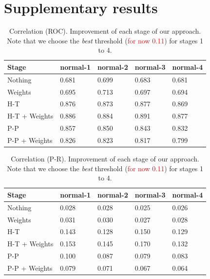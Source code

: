 \documentclass[wcp]{jmlr}
\begin{document}
\section{Supplementary results}

\begin{table}[htbp]
\centering
\caption{Correlation (ROC). Improvement of each stage of our approach. Note that we choose the
         \textit{best} threshold (\textcolor{red}{for now 0.11}) for stages 1 to 4.}
\begin{tabular}{*{5}{l}}
\toprule
Stage               & normal-1 & normal-2 & normal-3 & normal-4 \\
\midrule
Nothing             & 0.681 & 0.699 & 0.683 & 0.681\\
Weights             & 0.695 & 0.713 & 0.697 & 0.694\\
H-T                 & 0.876 & 0.873 & 0.877 & 0.869\\
H-T + Weights       & 0.886 & 0.884 & 0.891 & 0.877\\
P-P                 & 0.857 & 0.850 & 0.843 & 0.832\\
P-P + Weights       & 0.826 & 0.823 & 0.817 & 0.799\\
\bottomrule
\end{tabular}
\end{table}

\begin{table}[htbp]
\centering
\caption{Correlation (P-R). Improvement of each stage of our approach. Note that we choose the
         \textit{best} threshold (\textcolor{red}{for now 0.11}) for stages 1 to 4.}
\begin{tabular}{*{5}{l}}
\toprule
Stage               & normal-1 & normal-2 & normal-3 & normal-4 \\
\midrule
Nothing             & 0.028 & 0.028 & 0.025 & 0.026\\
Weights             & 0.031 & 0.030 & 0.027 & 0.028\\
H-T                 & 0.143 & 0.128 & 0.150 & 0.129\\
H-T + Weights       & 0.153 & 0.145 & 0.170 & 0.132\\
P-P                 & 0.100 & 0.087 & 0.079 & 0.083\\
P-P + Weights       & 0.079 & 0.071 & 0.067 & 0.064\\
\bottomrule
\end{tabular}
\end{table}
\end{document}
